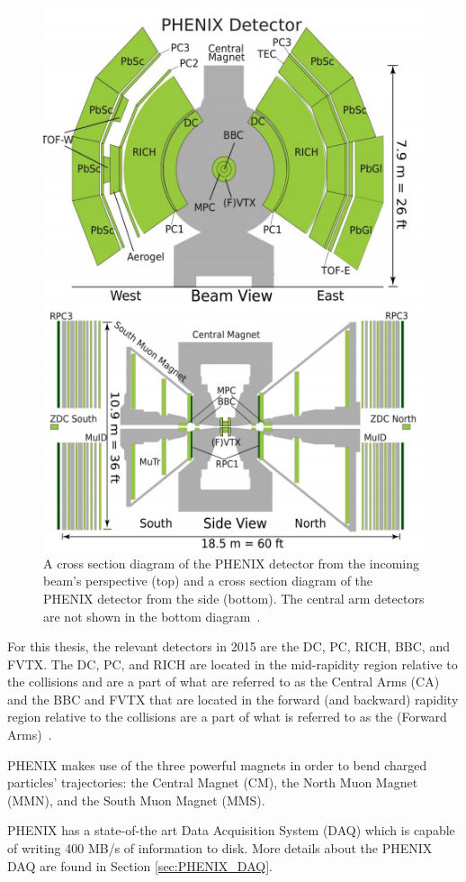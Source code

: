 \begin{figure}[!h]
\begin{center}
\includegraphics[width=0.55\linewidth]{figs/phenix_schematic.png}
\caption{A cross section diagram of the PHENIX detector from the incoming beam's perspective (top) and a cross section diagram of the PHENIX detector from the side (bottom). The central arm detectors are not shown in the bottom diagram~\cite{Aidala201444}.}
\label{fig:phenix_schematic}
\end{center}
\end{figure}

For this thesis, the relevant detectors in 2015 are the DC, PC, RICH, BBC, and FVTX. The DC, PC, and RICH are located in the mid-rapidity region relative to the collisions and are a part of  what are referred to as the Central Arms (CA) and the BBC and FVTX that are located in the forward (and backward) rapidity region relative to the collisions are a part of what is referred to as the (Forward Arms)~\cite{Adcox2003469}. 

PHENIX makes use of the three powerful magnets in order to bend charged particles' trajectories: the Central Magnet (CM), the North Muon Magnet (MMN), and the South Muon Magnet (MMS).

PHENIX has a state-of-the art Data Acquisition System (DAQ) which is capable of writing 400 MB/s of information to disk. More details about the PHENIX DAQ are found in Section \ref{sec:PHENIX_DAQ}.

